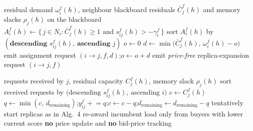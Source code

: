 \begin{algorithm}
\caption{\textsc{FaaS-MADiG} --- buyer greedy assignment (replaces Alg.~2)}
\label{alg:madig-buyer}
\begin{algorithmic}[1]
\Require residual demand $\omega_i^f(h)$, neighbour blackboard residuals $\bar C_j^f(h)$ and
         memory slacks $\rho_j(h)$ on the blackboard
  \State $A_i^f(h)\gets\{\,j\in N_i: \bar C_j^f(h)\ge 1 \text{ and } s_{ij}^f(h)>-\gamma_i^f\,\}$
  \State sort $A_i^f(h)$ by $(\textbf{descending }s_{ij}^f(h),\ \textbf{ascending }j)$
  \State $o\gets 0$ 
     \State $d\gets\min\!\big(\bar C_j^f(h),\,\omega_i^f(h)-o\big)$ 
     \State emit assignment request $(i\!\to\! j,f,d)$;\quad $o\gets o+d$
  \EndFor
   
        \State emit \emph{price-free} replica-expansion request $(i\!\to\! j,f)$
     \EndFor
  \EndIf
\EndFor
\end{algorithmic}
\end{algorithm}

\begin{algorithm}
\caption{\textsc{FaaS-MADiG} --- seller greedy fill (replaces Alg.~3)}
\label{alg:madig-seller}
\begin{algorithmic}[1]
\Require requests received by $j$, residual capacity $C_j^f(h)$, memory slack $\rho_j(h)$
  \State sort received requests by $\big(\text{descending } s_{ij}^f(h),\ \text{ascending } i\big)$
  \State $c\gets C_j^f(h)$
     \State $q\gets\min(c,\,d_{\text{remaining}})$;\quad $y_{ij}^f\mathrel{+}= q$;\quad $c\gets c-q$;\quad $d_{\text{remaining}}\gets d_{\text{remaining}}-q$
  \EndWhile
     \State tentatively start replicas as in Alg.~4 
  \EndIf
     \State re-award incumbent load only from buyers with lower current score
  \EndIf
\EndFor
\State \textbf{no} price update and \textbf{no} bid-price tracking
\end{algorithmic}
\end{algorithm}

